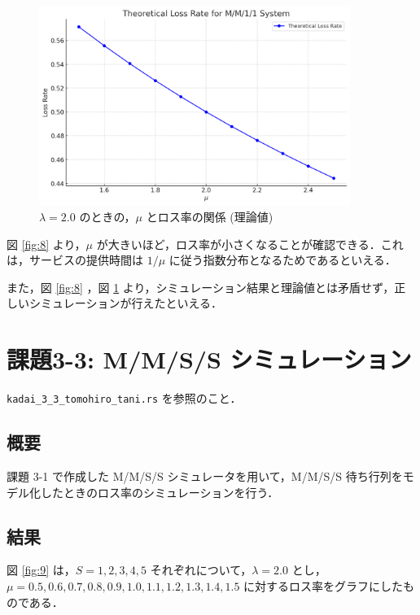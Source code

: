 \documentclass[fleqn, a4paper. 12pt]{jsarticle}
\begin{document}
      \begin{figure}[!h]
        \centering
        \includegraphics[width=0.9\textwidth]{t_3_2.png}
        \caption{$\lambda = 2.0$ のときの，$\mu$ とロス率の関係 (理論値)}
        \label{fig:t1}
      \end{figure}

      \quad

      図 \ref{fig:8} より，$\mu$ が大きいほど，ロス率が小さくなることが確認できる．これは，サービスの提供時間は $1/\mu$ に従う指数分布となるためであるといえる．

      また，図 \ref{fig:8} ，図 \ref{fig:t1} より，シミュレーション結果と理論値とは矛盾せず，正しいシミュレーションが行えたといえる．

  \newpage

  \section*{課題3-3: M/M/S/S シミュレーション}

      \texttt{kadai\_3\_3\_tomohiro\_tani.rs} を参照のこと．
  
      \subsection*{概要}
  
        課題 3-1 で作成した M/M/S/S シミュレータを用いて，M/M/S/S 待ち行列をモデル化したときのロス率のシミュレーションを行う．
        
      \subsection*{結果}
  
        図 \ref{fig:9} は，$S=1,2,3,4,5$ それぞれについて，$\lambda = 2.0$ とし，$\mu=0.5,0.6,0.7,0.8,0.9,1.0,1.1,1.2,1.3,1.4,1.5$ に対するロス率をグラフにしたものである．
  
\end{document}
